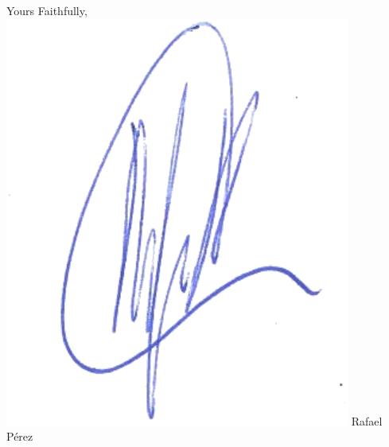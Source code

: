 \documentclass[10pt,stdletter,dateno,sigleft]{newlfm} %
\begin{document}
\begin{newlfm}
Yours Faithfully, \newline %
\includegraphics[scale=0.6]{sgtrBlue} \newline 
Rafael P\'erez


\end{newlfm}
\end{document}
